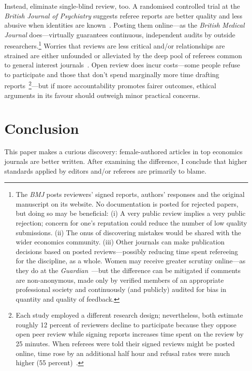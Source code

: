 Instead, eliminate single-blind review, too. A randomised controlled trial at the \emph{British Journal of Psychiatry} suggests referee reports are better quality and less abusive when identities are known~\citep{Walsh2000}. Posting them online---as the \emph{British Medical Journal} does---virtually guarantees continuous, independent audits by outside researchers.\footnote{The \emph{BMJ} posts reviewers' signed reports, authors' responses and the original manuscript on its website. No documentation is posted for rejected papers, but doing so may be beneficial: (i) A very public review implies a very public rejection; concern for one's reputation could reduce the number of low quality submissions. (ii) The onus of discovering mistakes would be shared with the wider economics community. (iii) Other journals can make publication decisions based on posted reviews---possibly reducing time spent refereeing for the discipline, as a whole. Women may receive greater scrutiny online---as they do at the \emph{Guardian}~\citep{Gardiner2016}---but the difference can be mitigated if comments are non-anonymous, made only by verified members of an appropriate professional society and continuously (and publicly) audited for bias in quantity and quality of feedback.} Worries that reviews are less critical and\slash or relationships are strained are either unfounded or alleviated by the deep pool of referees common to general interest journals~\citep{vanRooyen1999,vanRooyen2010}. Open review does incur costs---some people refuse to participate and those that don't spend marginally more time drafting reports~\citep{vanRooyen1999,Walsh2000}\footnote{Each study employed a different research design; nevertheless, both estimate roughly 12 percent of reviewers decline to participate because they oppose open peer review while signing reports increases time spent on the review by 25 minutes. When referees were told their signed reviews might be posted online, time rose by an additional half hour and refusal rates were much higher (55 percent)~\citep{vanRooyen2010}.}---but if more accountability promotes fairer outcomes, ethical arguments in its favour should outweigh minor practical concerns.

\section{Conclusion}
\label{conclusion}

This paper makes a curious discovery: female-authored articles in top economics journals are better written. After examining the difference, I conclude that higher standards applied by editors and\slash or referees are primarily to blame.

